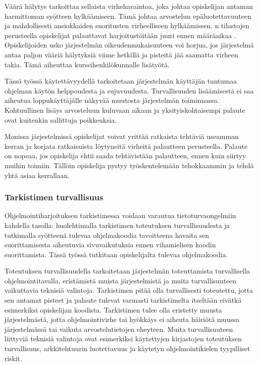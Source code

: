 Väärä hälytys tarkoittaa sellaista virhehavaintoa, joka johtaa opiskelijan
antaman harmittoman syötteen hylkäämiseen. Tämä johtaa arvostelun
epäluotettavuuteen ja mahdollisesti ansiokkaiden suoritusten virheelliseen
hylkäämiseen. {\scmrobo}n tilastojen perusteella opiskelijat palauttavat
harjoitustöitään juuri ennen määräaikaa \citep{saikkonen2001fully}.
Opiskelijoiden usko järjestelmän oikeudenmukaisuuteen voi horjua, jos
järjestelmä antaa paljon vääriä hälytyksiä viime hetkillä ja pisteitä jää
saamatta virheen takia. Tämä aiheuttaa kurssihenkilökunnalle lisätyötä.

Tässä työssä käytettävyydellä tarkoitetaan järjestelmän käyttäjän tuntumaa
ohjelman käytön helppoudesta ja sujuvuudesta. Turvallisuuden lisäämisestä
ei saa aiheutua loppukäyttäjälle näkyvää muutosta järjestelmän toiminnassa.
Kohtuullinen lisäys arvosteluun kuluvaan aikaan ja yksityiskohtaisempi
palaute ovat kuitenkin sallittuja poikkeuksia.

Monissa järjestelmissä opiskelijat voivat yrittää ratkaista tehtäviä useamman
kerran ja korjata ratkaisuista löytyneitä virheitä palautteen perusteella.
Palaute on nopeaa, jos opiskelija ehtii saada tehtävistään palautteen, ennen
kuin siirtyy muihin toimiin. Tällöin opiskelija pystyy työskentelemään
tehokkaammin ja tehdä yhtä asiaa kerrallaan.

\subsubsection{Tarkistimen turvallisuus}

Ohjelmointiharjoituksen tarkistimessa voidaan varautua tietoturvaongelmiin
kahdella tasolla: huolehtimalla tarkistimen toteutuksen turvallisuudesta ja
tutkimalla syötteenä tulevaa ohjelmakoodia tavoitteena havaita sen
suorittamisesta aiheutuvia sivuvaikutuksia ennen vihamielisen koodin
suorittamista. Tässä työssä tutkitaan opiskelijalta tulevaa ohjelmakoodia.

Toteutuksen turvallisuudella tarkoitetaan järjestelmän toteuttamista
turvallisella ohjelmointitavalla, eristämistä muista järjestelmistä ja
muita turvallisuuteen vaikuttavia teknisiä valintoja.
Tarkistimen pitää olla turvallisesti toteutettu, jotta sen antamat pisteet ja
palaute tulevat varmasti tarkistimelta itseltään eivätkä esimerkiksi opiskelijan
koodista. Tarkistimen tulee olla eristetty muusta järjestelmästä, jotta
ohjelmointivirhe tai hyökkäys ei aiheuta häiriötä muussa järjestelmässä tai
vaikuta arvostelutietojen eheyteen. Muita turvallisuuteen liittyviä teknisiä
valintoja ovat esimerkiksi käytettyjen kirjastojen toteutuksen turvallisuus,
arkkitehtuurin luotettavuus ja käytetyn ohjelmointikielen tyypilliset riskit.

